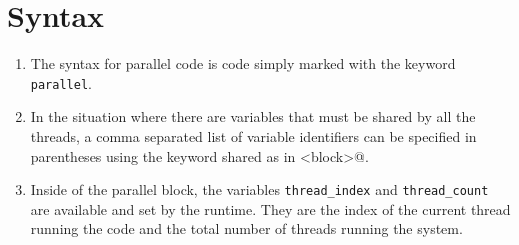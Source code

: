 \section{Syntax}
\begin{enumerate}
	\item The syntax for parallel code is code simply marked with the keyword \lstinline|parallel|.
	\item In the situation where there are variables that must be shared by all the threads, a comma separated list of variable identifiers can be specified in parentheses using the keyword shared as in \lstinline@parallel <block>@.
	\item Inside of the parallel block, the variables \lstinline|thread_index| and \lstinline|thread_count| are available and set by the \lepix{} runtime. They are the index of the current thread running the code and the total number of threads running the system.
\end{enumerate}
